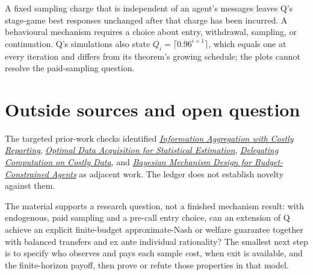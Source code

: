 \documentclass{article}
\begin{document}
A fixed sampling charge that is independent of an agent's messages leaves Q's stage-game best responses unchanged after that charge has been incurred. A behavioural mechanism requires a choice about entry, withdrawal, sampling, or continuation. Q's simulations also state \(Q_i=\lceil0.96^{i+1}\rceil\), which equals one at every iteration and differs from its theorem's growing schedule; the plots cannot resolve the paid-sampling question. 

\section{Outside sources and open question}
The targeted prior-work checks identified \href{https://academic.oup.com/ej/article/130/625/208/5593948}{\emph{Information Aggregation with Costly Reporting}}, \href{https://authors.library.caltech.edu/records/dxhp4-jvk64}{\emph{Optimal Data Acquisition for Statistical Estimation}}, \href{https://people.csail.mit.edu/silvio/Selected%20Scientific%20Papers/Mechanism%20Design/Delegating%20Computation%20On%20Costly%20Data.pdf}{\emph{Delegating Computation on Costly Data}}, and \href{https://arxiv.org/abs/1103.6280}{\emph{Bayesian Mechanism Design for Budget-Constrained Agents}} as adjacent work. The ledger does not establish novelty against them. 

The material supports a research question, not a finished mechanism result: with endogenous, paid sampling and a pre-call entry choice, can an extension of Q achieve an explicit finite-budget approximate-Nash or welfare guarantee together with balanced transfers and ex ante individual rationality? The smallest next step is to specify who observes and pays each sample cost, when exit is available, and the finite-horizon payoff, then prove or refute those properties in that model. 
\end{document}
